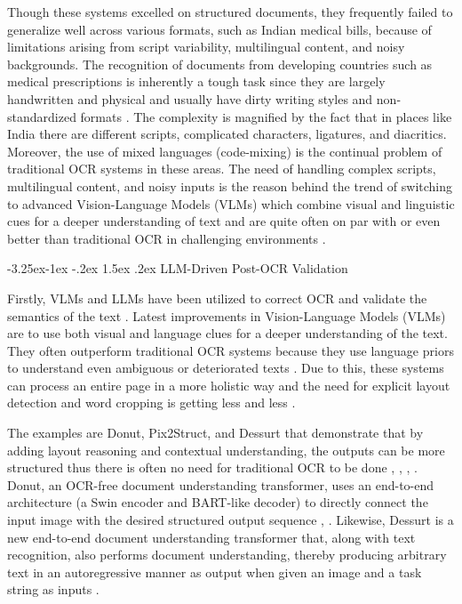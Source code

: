 \documentclass[conference,twocolumn]{IEEEtran}
\makeatletter
\renewcommand{\subsection}{\@startsection{subsection}{2}{\z@}%
  {-3.25ex\@plus -1ex \@minus -.2ex}%
  {1.5ex \@plus .2ex}%
  {\normalfont\normalsize\bfseries\itshape}}
\makeatother
\begin{document}
Though these systems excelled on structured documents, they frequently
failed to generalize well across various formats, such as Indian medical
bills, because of limitations arising from script variability,
multilingual content, and noisy backgrounds. The recognition of
documents from developing countries such as medical prescriptions is
inherently a tough task since they are largely handwritten and physical
and usually have dirty writing styles and non-standardized formats
\cite{ref6}. The complexity is magnified by the fact that in places like
India there are different scripts, complicated characters, ligatures,
and diacritics. Moreover, the use of mixed languages (code-mixing) is
the continual problem of traditional OCR systems in these areas. The
need of handling complex scripts, multilingual content, and noisy inputs
is the reason behind the trend of switching to advanced Vision-Language
Models (VLMs) which combine visual and linguistic cues for a deeper
understanding of text and are quite often on par with or even better
than traditional OCR in challenging environments \cite{ref5}.

\subsection{LLM-Driven Post-OCR Validation}

Firstly, VLMs and LLMs have been utilized to correct OCR and validate the
semantics of the text \cite{ref5}. Latest improvements in Vision-Language
Models (VLMs) are to use both visual and language clues for a deeper
understanding of the text. They often outperform traditional OCR systems
because they use language priors to understand even ambiguous or
deteriorated texts \cite{ref5}. Due to this, these systems can process an
entire page in a more holistic way and the need for explicit layout
detection and word cropping is getting less and less \cite{ref5}.

The examples are Donut, Pix2Struct, and Dessurt that demonstrate that by
adding layout reasoning and contextual understanding, the outputs can be
more structured thus there is often no need for traditional OCR to be
done \cite{ref4}, \cite{ref5}, \cite{ref11}, \cite{ref17}. Donut, an OCR-free document
understanding transformer, uses an end-to-end architecture (a Swin
encoder and BART-like decoder) to directly connect the input image with
the desired structured output sequence \cite{ref4}, \cite{ref5}. Likewise,
Dessurt is a new end-to-end document understanding transformer that,
along with text recognition, also performs document understanding,
thereby producing arbitrary text in an autoregressive manner as output
when given an image and a task string as inputs \cite{ref11}.
\end{document}
